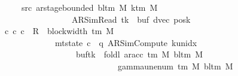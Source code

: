 \begin{isabellebody}
\ \ \ \ \ \ \ src{}{\isacharcolon}{\kern0pt}\ {\isachardoublequoteopen}ar{\isacharunderscore}{\kern0pt}stage{\isacharunderscore}{\kern0pt}bounded\ {\isacharparenleft}{\kern0pt}bl{\isacharunderscore}{\kern0pt}tm\ M{\isacharparenright}{\kern0pt}\ {\isacharparenleft}{\kern0pt}k{\isacharunderscore}{\kern0pt}tm\ M{\isacharparenright}{\kern0pt}\isanewline
\ \ \ \ \ \ \ \ \ \ \ \ \ \ \ \ \ \ \ {\isacharparenleft}{\kern0pt}AR{\isacharunderscore}{\kern0pt}SimRead{\isacharcomma}{\kern0pt}\ tk{\isacharcomma}{\kern0pt}\ {}{\isacharcomma}{\kern0pt}\ buf{\isacharcomma}{\kern0pt}\ dvec{\isacharcomma}{\kern0pt}\ posk{\isacharparenright}{\kern0pt}{\isachardoublequoteclose}\isanewline
\ \ \ {\isachardoublequoteopen}{\isasymexists}c{\isacharprime}{\kern0pt}{\isacharprime}{\kern0pt}{\isachardot}{\kern0pt}\ {\isacharparenleft}{\kern0pt}c{\isacharprime}{\kern0pt}{\isacharcomma}{\kern0pt}\ c{\isacharprime}{\kern0pt}{\isacharprime}{\kern0pt}{\isacharparenright}{\kern0pt}\ {\isasymin}\ R{\isacharprime}{\kern0pt}\ {\isacharcircum}{\kern0pt}{\isacharcircum}{\kern0pt}\ {\isacharparenleft}{\kern0pt}block{\isacharunderscore}{\kern0pt}width\ {\isacharparenleft}{\kern0pt}{\isasymGamma}{\isacharunderscore}{\kern0pt}tm\ M{\isacharparenright}{\kern0pt}\ {\isacharplus}{\kern0pt}\ {}{\isacharparenright}{\kern0pt}\isanewline
\ \ \ \ \ \ \ \ \ \ \ \ \ \ {\isasymand}\ mt{\isacharunderscore}{\kern0pt}state\ c{\isacharprime}{\kern0pt}{\isacharprime}{\kern0pt}\ {\isacharequal}{\kern0pt}\ {\isacharparenleft}{\kern0pt}q{\isacharcomma}{\kern0pt}\ AR{\isacharunderscore}{\kern0pt}SimCompute{\isacharcomma}{\kern0pt}\ k{\isacharunderscore}{\kern0pt}unidx\ {}{\isacharcomma}{\kern0pt}\ {}{\isacharcomma}{\kern0pt}\isanewline
\ \ \ \ \ \ \ \ \ \ \ \ \ \ \ \ \ \ \ \ buf{\isacharparenleft}{\kern0pt}tk\ {\isacharcolon}{\kern0pt}{\isacharequal}{\kern0pt}\ foldl\ {\isacharparenleft}{\kern0pt}ar{\isacharunderscore}{\kern0pt}acc\ {\isacharparenleft}{\kern0pt}{\isasymGamma}{\isacharunderscore}{\kern0pt}tm\ M{\isacharparenright}{\kern0pt}\ {\isacharparenleft}{\kern0pt}bl{\isacharunderscore}{\kern0pt}tm\ M{\isacharparenright}{\kern0pt}{\isacharparenright}{\kern0pt}\isanewline
\ \ \ \ \ \ \ \ \ \ \ \ \ \ \ \ \ \ \ \ \ \ \ \ \ \ \ \ \ \ {\isacharparenleft}{\kern0pt}gamma{\isacharunderscore}{\kern0pt}unenum\ {\isacharparenleft}{\kern0pt}{\isasymGamma}{\isacharunderscore}{\kern0pt}tm\ M{\isacharparenright}{\kern0pt}\ {\isacharparenleft}{\kern0pt}bl{\isacharunderscore}{\kern0pt}tm\ M{\isacharparenright}{\kern0pt}\ {}{\isacharparenright}{\kern0pt}\isanewline

\end{isabellebody}
